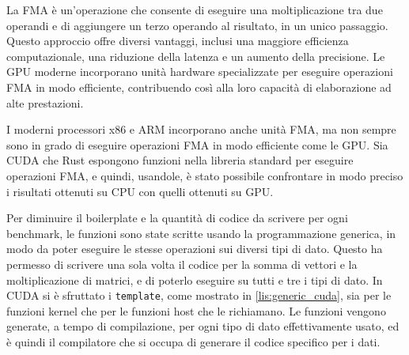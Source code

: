 La FMA è un'operazione che consente di eseguire una moltiplicazione tra due operandi e di aggiungere un terzo operando al risultato, in un unico passaggio. Questo approccio offre diversi vantaggi, inclusi una maggiore efficienza computazionale, una riduzione della latenza e un aumento della precisione. Le GPU moderne incorporano unità hardware specializzate per eseguire operazioni FMA in modo efficiente, contribuendo così alla loro capacità di elaborazione ad alte prestazioni. %

I moderni processori x86 e ARM incorporano anche unità FMA, ma non sempre sono in grado di eseguire operazioni FMA in modo efficiente come le GPU. Sia CUDA che Rust espongono funzioni nella libreria standard per eseguire operazioni FMA, e quindi, usandole, è stato possibile confrontare in modo preciso i risultati ottenuti su CPU con quelli ottenuti su GPU.


Per diminuire il boilerplate e la quantità di codice da scrivere per ogni benchmark, le funzioni sono state scritte usando la programmazione generica, in modo da poter eseguire le stesse operazioni sui diversi tipi di dato. Questo ha permesso di scrivere una sola volta il codice per la somma di vettori e la moltiplicazione di matrici, e di poterlo eseguire su tutti e tre i tipi di dato. In CUDA si è sfruttato i \verb|template|, come mostrato in \ref{lis:generic_cuda}, sia per le funzioni kernel che per le funzioni host che le richiamano. Le funzioni vengono generate, a tempo di compilazione, per ogni tipo di dato effettivamente usato, ed è quindi il compilatore che si occupa di generare il codice specifico per i dati. 

